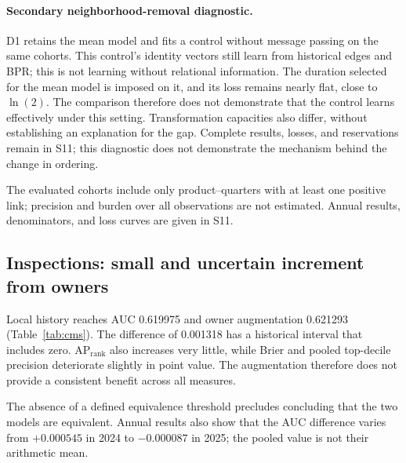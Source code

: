 \paragraph{Secondary neighborhood-removal diagnostic.} D1 retains the mean model and fits a control without message passing on the same cohorts. This control's identity vectors still learn from historical edges and BPR; this is not learning without relational information. The duration selected for the mean model is imposed on it, and its loss remains nearly flat, close to $\ln(2)$. The comparison therefore does not demonstrate that the control learns effectively under this setting. Transformation capacities also differ, without establishing an explanation for the gap. Complete results, losses, and reservations remain in S11; this diagnostic does not demonstrate the mechanism behind the change in ordering.

The evaluated cohorts include only product--quarters with at least one positive link; precision and burden over all observations are not estimated. Annual results, denominators, and loss curves are given in S11.

\subsection{Inspections: small and uncertain increment from owners}

\begin{table}[!htbp]
\centering\small
\caption{CMS inspections, pooled 2024--2025 test predictions. $P_{10\%}$ and $R_{10\%}$: precision and recall at the decile calculated on pooled scores, not separately by year. Brier should decrease; the other measures should increase. Source: unified table\cite{hgbresults}.}
\label{tab:cms}

\end{table}

Local history reaches AUC 0.619975 and owner augmentation 0.621293 (Table~\ref{tab:cms}). The difference of 0.001318 has a historical interval that includes zero. $\mathrm{AP}_{\mathrm{rank}}$ also increases very little, while Brier and pooled top-decile precision deteriorate slightly in point value. The augmentation therefore does not provide a consistent benefit across all measures\cite{hgbresults}.

The absence of a defined equivalence threshold precludes concluding that the two models are equivalent. Annual results also show that the AUC difference varies from $+0.000545$ in 2024 to $-0.000087$ in 2025; the pooled value is not their arithmetic mean\cite{hgbresults}.


